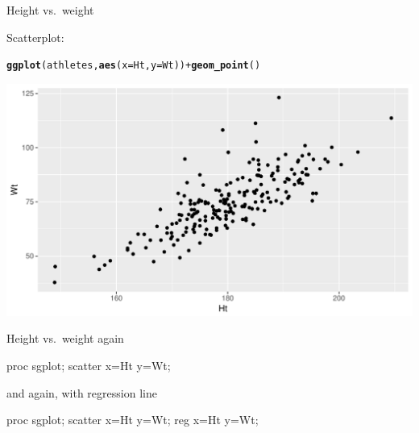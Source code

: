 \documentclass[unknownkeysallowed]{beamer}\usepackage[]{graphicx}\usepackage[]{color}
\makeatletter
\def\maxwidth{ %
  \ifdim\Gin@nat@width>\linewidth
    \linewidth
  \else
    \Gin@nat@width
  \fi
}
\newcommand{\hlopt}[1]{\textcolor[rgb]{0,0,0}{#1}}%
\newcommand{\hlstd}[1]{\textcolor[rgb]{0.345,0.345,0.345}{#1}}%
\newcommand{\hlkwc}[1]{\textcolor[rgb]{0.333,0.667,0.333}{#1}}%
\newcommand{\hlkwd}[1]{\textcolor[rgb]{0.737,0.353,0.396}{\textbf{#1}}}%
\newenvironment{kframe}{%
 \def\at@end@of@kframe{}%
 \ifinner\ifhmode%
  \def\at@end@of@kframe{\end{minipage}}%
  \begin{minipage}{\columnwidth}%
 \fi\fi%
 \def\FrameCommand##1{\hskip\@totalleftmargin \hskip-\fboxsep
 \colorbox{shadecolor}{##1}\hskip-\fboxsep
     \hskip-\linewidth \hskip-\@totalleftmargin \hskip\columnwidth}%
 \MakeFramed {\advance\hsize-\width
   \@totalleftmargin\z@ \linewidth\hsize
   \@setminipage}}%
 {\par\unskip\endMakeFramed%
 \at@end@of@kframe}
\newenvironment{knitrout}{}{} %
\makeatother
\begin{document}
\begin{frame}[fragile]{Height vs.\ weight}
  
  Scatterplot:
  
\begin{knitrout}
\color{fgcolor}\begin{kframe}
\begin{alltt}
\hlkwd{ggplot}\hlstd{(athletes,}\hlkwd{aes}\hlstd{(}\hlkwc{x}\hlstd{=Ht,}\hlkwc{y}\hlstd{=Wt))}\hlopt{+}\hlkwd{geom_point}\hlstd{()}
\end{alltt}
\end{kframe}
\includegraphics[width=\maxwidth]{figure/unnamed-chunk-31-1} 

\end{knitrout}
  
\end{frame}

\begin{frame}[fragile]{Height vs.\ weight again}
  
  \begin{Sascode}[store=gh]
proc sgplot;
  scatter x=Ht y=Wt;
  \end{Sascode}
  
  
\end{frame}

\begin{frame}[fragile]{and again, with regression line}
  
  \begin{Sascode}[store=gj]
proc sgplot;
  scatter x=Ht y=Wt;
  reg x=Ht y=Wt;
  \end{Sascode}
  
  
  
\end{frame}
\end{document}
